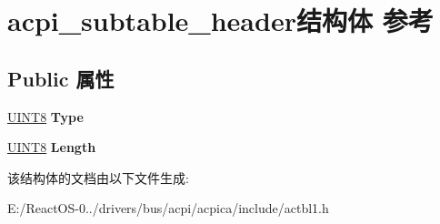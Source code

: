 \hypertarget{structacpi__subtable__header}{}\section{acpi\+\_\+subtable\+\_\+header结构体 参考}
\label{structacpi__subtable__header}
\subsection*{Public 属性}
\begin{DoxyCompactItemize}
\item 
\mbox{\label{structacpi__subtable__header_a816c75d9b6c831e246e6f66085ecfa92}} 
\hyperlink{_processor_bind_8h_ab27e9918b538ce9d8ca692479b375b6a}{U\+I\+N\+T8} {\bfseries Type}
\item 
\mbox{\label{structacpi__subtable__header_a2571b37a43daab428c1db217447d18ea}} 
\hyperlink{_processor_bind_8h_ab27e9918b538ce9d8ca692479b375b6a}{U\+I\+N\+T8} {\bfseries Length}
\end{DoxyCompactItemize}


该结构体的文档由以下文件生成\+:\begin{DoxyCompactItemize}
\item 
E\+:/\+React\+O\+S-\/0../drivers/bus/acpi/acpica/include/actbl1.\+h\end{DoxyCompactItemize}

